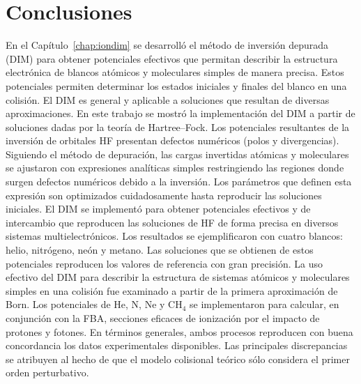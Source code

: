 \chapter{Conclusiones}
\label{chap:conclusiones}


En el Capítulo~\ref{chap:iondim} se desarrolló el método de inversión 
depurada (DIM) para obtener potenciales efectivos que permitan describir 
la estructura electrónica de blancos atómicos y moleculares simples de 
manera precisa. Estos potenciales permiten determinar los estados 
iniciales y finales del blanco en una colisión. El DIM es general y 
aplicable a soluciones que resultan de diversas aproximaciones. En este 
trabajo se mostró la implementación del DIM a partir de soluciones dadas 
por la teoría de Hartree--Fock. Los potenciales resultantes de la 
inversión de orbitales HF presentan defectos numéricos (polos y 
divergencias). Siguiendo el método de depuración, las cargas invertidas 
atómicas y moleculares se ajustaron con expresiones analíticas simples 
restringiendo las regiones donde surgen defectos numéricos debido a la 
inversión. Los parámetros que definen esta expresión son optimizados 
cuidadosamente hasta reproducir las soluciones iniciales. 
El DIM se implementó para obtener potenciales efectivos y de intercambio 
que reproducen las soluciones de HF de forma precisa en diversos 
sistemas multielectrónicos. Los resultados se ejemplificaron con cuatro
blancos: helio, nitrógeno, neón y metano. Las soluciones que se obtienen 
de estos potenciales reproducen los valores de referencia con gran 
precisión. La uso efectivo del DIM para describir la estructura de 
sistemas atómicos y moleculares simples en una colisión fue examinado a 
partir de la primera aproximación de Born. Los 
potenciales de He, N, Ne y CH$_4$ se implementaron para calcular, en 
conjunción con la FBA, secciones eficaces de ionización por el impacto 
de protones y fotones. En términos generales, ambos procesos reproducen 
con buena concordancia los datos experimentales disponibles. Las 
principales discrepancias se atribuyen al hecho de que el modelo 
colisional teórico sólo considera el primer orden perturbativo. 




